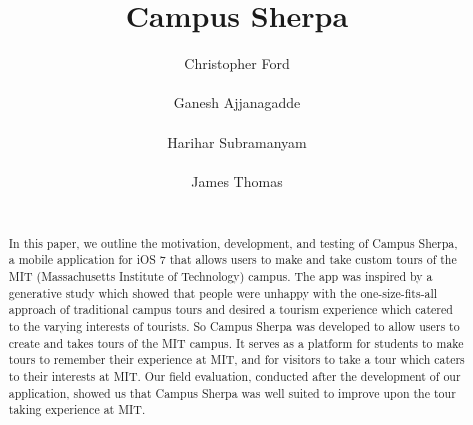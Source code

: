 \documentclass{sigchi}
\begin{document}
\title{Campus Sherpa}

\author{
  \alignauthor Christopher Ford\\
    \\
  \alignauthor Ganesh Ajjanagadde\\
    \\  
  \alignauthor Harihar Subramanyam\\
    \\
   \alignauthor James Thomas\\
    \\
}

\maketitle

\begin{abstract}
In this paper, we outline the motivation, development, and testing of Campus Sherpa, a mobile application for iOS 7 that allows users to make and take custom tours of the MIT (Massachusetts Institute of Technology) campus. The app was inspired by a generative study which showed that people were unhappy with the one-size-fits-all approach of traditional campus tours and desired a tourism experience which catered to the varying interests of tourists. So Campus Sherpa was developed to allow users to create and takes tours of the MIT campus. It serves as a platform for students to make tours to remember their experience at MIT, and for visitors to take a tour which caters to their interests at MIT. Our field evaluation, conducted after the development of our application, showed us that Campus Sherpa was well suited to improve upon the tour taking experience at MIT. 
\end{abstract}


%
%
\end{document}
